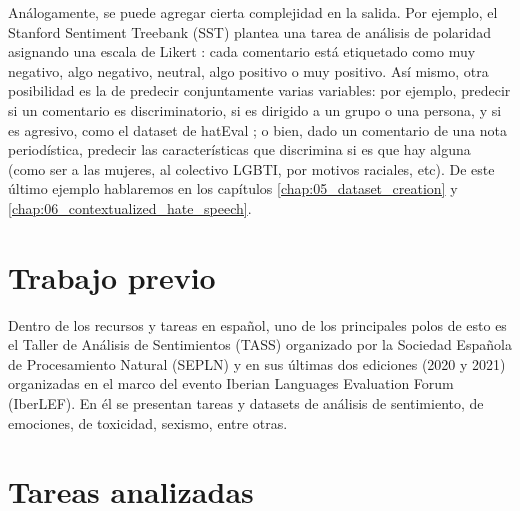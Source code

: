 Análogamente, se puede agregar cierta complejidad en la salida. Por ejemplo, el Stanford Sentiment Treebank (SST) \cite{socher-etal-2013-recursive} plantea una tarea de análisis de polaridad asignando una escala de Likert \cite{likert1932technique}: cada comentario está etiquetado como muy negativo, algo negativo, neutral, algo positivo o muy positivo. Así mismo, otra posibilidad es la de predecir conjuntamente varias variables: por ejemplo, predecir si un comentario es discriminatorio, si es dirigido a un grupo o una persona, y si es agresivo, como el dataset de hatEval \cite{hateval2019semeval}; o bien, dado un comentario de una nota periodística, predecir las características que discrimina si es que hay alguna (como ser a las mujeres, al colectivo LGBTI, por motivos raciales, etc). De este último ejemplo hablaremos en los capítulos \ref{chap:05_dataset_creation} y \ref{chap:06_contextualized_hate_speech}.




\section{Trabajo previo}


Dentro de los recursos y tareas en español, uno de los principales polos de esto es el Taller de Análisis de Sentimientos (TASS) \cite{overview_tass2018,garcia2020overview,cumbreras2016overview} organizado por la Sociedad Española de Procesamiento Natural (SEPLN) y en sus últimas dos ediciones (2020 y 2021) organizadas en el marco del evento Iberian Languages Evaluation Forum (IberLEF). En él se presentan tareas y datasets de análisis de sentimiento, de emociones, de toxicidad, sexismo, entre otras. 


\section{Tareas analizadas}


